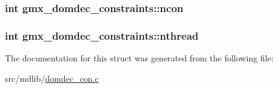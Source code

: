 \hypertarget{structgmx__domdec__constraints_aaed984e12054cba5d3c9115c0397701e}{
\subsubsection[{ncon}]{\setlength{\rightskip}{0pt plus 5cm}int {\bf gmx\-\_\-domdec\-\_\-constraints\-::ncon}}}\label{structgmx__domdec__constraints_aaed984e12054cba5d3c9115c0397701e}
\hypertarget{structgmx__domdec__constraints_ab36a932b3b692f26c3d96cf2af40a71d}{
\subsubsection[{nthread}]{\setlength{\rightskip}{0pt plus 5cm}int {\bf gmx\-\_\-domdec\-\_\-constraints\-::nthread}}}\label{structgmx__domdec__constraints_ab36a932b3b692f26c3d96cf2af40a71d}


\-The documentation for this struct was generated from the following file\-:\begin{DoxyCompactItemize}
\item 
src/mdlib/\hyperlink{domdec__con_8c}{domdec\-\_\-con.\-c}\end{DoxyCompactItemize}
